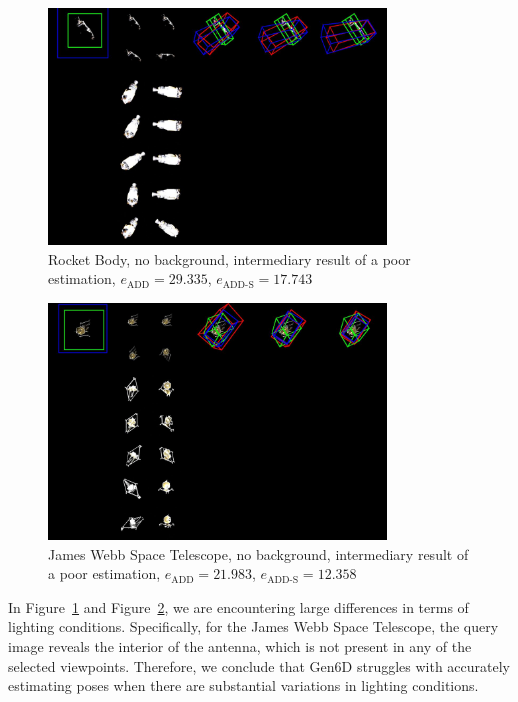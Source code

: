 \begin{figure}[ht]
  \centering
  \includegraphics[width=0.8\textwidth]{data/fig14.jpg}
  \caption{Rocket Body, no background, intermediary result of a poor estimation, $e_\mathrm{ADD}=29.335$, $e_{\mathrm{ADD}\text{-}\mathrm{S}}=17.743$}
  \label{fig:fig14}
\end{figure}

\bigskip

\begin{figure}[ht]
  \centering
  \includegraphics[width=0.8\textwidth]{data/fig15.jpg}
  \caption{James Webb Space Telescope, no background, intermediary result of a poor estimation, $e_\mathrm{ADD}=21.983$, $e_{\mathrm{ADD}\text{-}\mathrm{S}}=12.358$}
  \label{fig:fig15}
\end{figure}

\bigskip

In Figure~\ref{fig:fig14} and Figure~\ref{fig:fig15}, we are encountering large differences in terms of lighting conditions. Specifically, for the James Webb Space Telescope, the query image reveals the interior of the antenna, which is not present in any of the selected viewpoints. Therefore, we conclude that Gen6D struggles with accurately estimating poses when there are substantial variations in lighting conditions.



